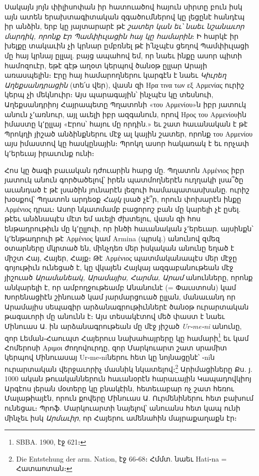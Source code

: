 \documentclass{article}
\begin{document}
{Սակայն յոյն փիլիսոփան իր հատուածով հայուն սիրտը բուն իսկ այն ատեն երախտագիտական զգածումներով կը լեցընէ հանդէպ իր անձին, երբ կը յայտարարէ թէ \emph{շատեր կան եւ՝ նաեւ նշանաւոր մարդիկ, որոնք Էր Պամփիւլացին հայ կը համարին}։ Ի հարկէ իր խելքը տակաւին չի կրնար ըմբռնել թէ ի՛նչպէս ցեղով Պամփիւլացի մը հայ կրնայ ըլլալ. բայց ապահով եմ, որ նաեւ ինքը ասոր պիտի համոզուէր, եթէ գէթ աղօտ կերպով ծանօթ ըլլար Արայի առասպելին։ Էրը հայ համարողներու կարգէն է նաեւ \emph{Կիւրեղ Աղեքսանդրացին} (տե՛ս վեր), վասն զի Ηρα τινα των εξ Αρμενίας ուրիշ կերպ չի մեկնուիր։ Այս պարագային՝ ինչպէս կը տեսնուի, Աղեքսանդրիոյ Հայրապետը Պղատոնի «του Αρμενίου»ն իբր յատուկ անուն չ՚առնուր, այլ աւելի իբր ազգանուն, որով Ηρος του Αρμενίουին իմաստը կ՚ըլլայ «Էրոս՝ հայու մը որդին.» եւ շատ հաւանական է թէ Պրոկղի յիշած անձինքներու մէջ ալ կային շատեր, որոնք του Αρμενίου այս իմաստով կը հասկընային։ Պրոկղ ասոր հակառակ է եւ որչափ կ՚երեւայ իրաւունք ունի։

Հոս կը ծագի բաւական դժուարին հարց մը. Պղատոն Αρμένιος իբր յատուկ անուն գործածելով՝ իրեն պատմողներէն ուղղակի լսա՞ծը աւանդած է թէ լսածին յունարէն լեզուի համապատասխանը. ուրիշ խօսքով՝ Պղատոն արդեօք \emph{Հայկ} լսած չէ՞ր, որուն փոխարէն ինքը Αρμένιος դրաւ։ Ասոր նկատմամբ բացորոշ բան մը կարելի չէ ըսել. թէեւ անձնապէս մէտ եմ աւելի ժխտելու, վասն զի հոս ենթադրութիւն մը կ՚ըլլուի, որ ինծի հաւանական չ՚երեւար. այսինքն՝ կ՚ենթադրուի թէ Αρμένιος կամ Armina (պրսկ.) անունով զմեզ օտարները մկրտած են, մինչդեռ մեր իսկական անունը եղած է միշտ Հայ, Հայեր, Հայք։ Թէ Αρμένιος պատմականապէս մեր մէջը գոյութիւն ունեցած է, կը վկայեն Հայկայ ազգաբանութեան մէջ յիշուած \emph{Արամանեակ, Արամայիս, Հարմա, Արամ} անունները, որոնք անկարելի է, որ ամբողջութեամբ Անանունէ (= Փաւստոսն) կամ Խորենացիէն շինուած կամ յարմարցուած ըլլան, մանաւանդ որ Արամայիս սեպագիր արձանագրութիւններէ ծանօթ ուրարտական թագաւորի մը անունն է։ Այս տեսակէտով մեծ փաստ է նաեւ Մինուաս Ա. ին արձանագրութեան մը մէջ յիշած \emph{Ur֊me֊ni} անունը, զոր Լեման֊Հաուպտ Հայերուս նախահայրերը կը համարի\footnote{SBBA. 1900, էջ 621։} եւ կամ Հոմերոսի Αριμοι ժողովուրդը, զոր Մարկուարտ շատ սրամիտ կերպով Մինուասայ Ur֊me֊niներու հետ կը նոյնացընէ՝ ֊niն ուրարտական վերջաւորիչ մասնիկ նկատելով։\footnote{Die Entstehung der arm. Nation, էջ 66֊68։ Հմմտ. նաեւ Hati֊na = Հատաոտան։} Արիմացիները Քս. յ. 1000 ական թուականներուն հաւանօրէն հարաւային Կապադովկիոյ Արգէոս լերան մօտերը կը բնակէին, հետեւաբար ոչ շատ հեռու Մալաթիայէն, որուն քովերը Մինուաս Ա. Ուրմենիներու հետ բախում ունեցաւ։ Պրոֆ. Մարկուարտի նայելով՝ անուանս հետ կապ ունի մինչեւ իսկ \emph{Արմաւիր}, որ Հայերու ամենահին մայրաքաղաքն էր։

}
\end{document}
